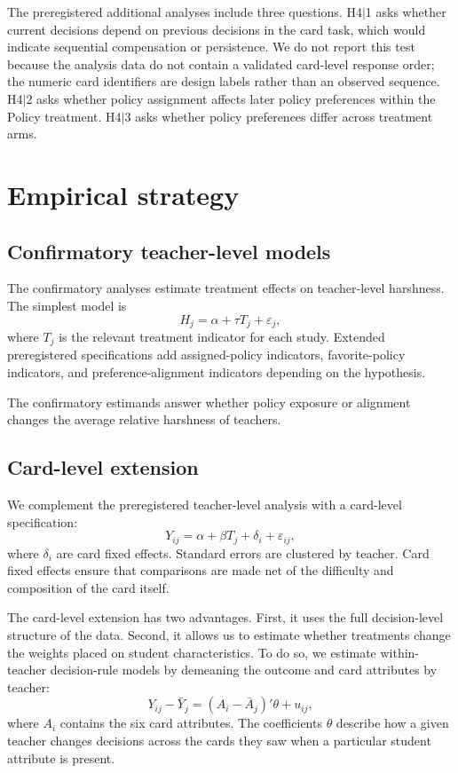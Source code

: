 \documentclass[12pt,a4paper]{article}
\begin{document}
The preregistered additional analyses include three questions. H4\(|\)1 asks whether current decisions depend on previous decisions in the card task, which would indicate sequential compensation or persistence. We do not report this test because the analysis data do not contain a validated card-level response order; the numeric card identifiers are design labels rather than an observed sequence. H4\(|\)2 asks whether policy assignment affects later policy preferences within the Policy treatment. H4\(|\)3 asks whether policy preferences differ across treatment arms.

\section{Empirical strategy}

\subsection{Confirmatory teacher-level models}

The confirmatory analyses estimate treatment effects on teacher-level harshness. The simplest model is
\[
H_j = \alpha + \tau T_j + \varepsilon_j,
\]
where \(T_j\) is the relevant treatment indicator for each study. Extended preregistered specifications add assigned-policy indicators, favorite-policy indicators, and preference-alignment indicators depending on the hypothesis.

The confirmatory estimands answer whether policy exposure or alignment changes the average relative harshness of teachers.

\subsection{Card-level extension}

We complement the preregistered teacher-level analysis with a card-level specification:
\[
Y_{ij} = \alpha + \beta T_j + \delta_i + \varepsilon_{ij},
\]
where \(\delta_i\) are card fixed effects. Standard errors are clustered by teacher. Card fixed effects ensure that comparisons are made net of the difficulty and composition of the card itself.

The card-level extension has two advantages. First, it uses the full decision-level structure of the data. Second, it allows us to estimate whether treatments change the weights placed on student characteristics. To do so, we estimate within-teacher decision-rule models by demeaning the outcome and card attributes by teacher:
\[
Y_{ij}-\bar{Y}_{j} = (A_i-\bar{A}_{j})'\theta + u_{ij},
\]
where \(A_i\) contains the six card attributes. The coefficients \(\theta\) describe how a given teacher changes decisions across the cards they saw when a particular student attribute is present.
\end{document}
